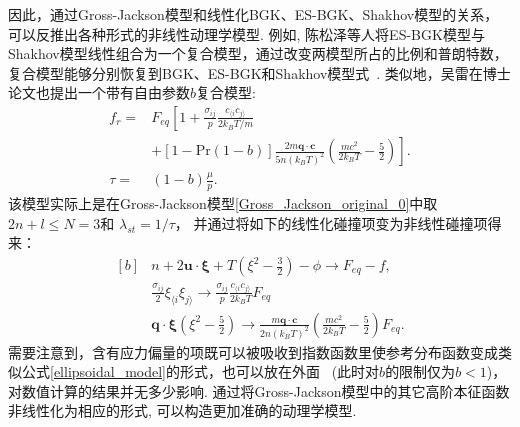 因此，通过Gross-Jackson模型和线性化BGK、ES-BGK、Shakhov模型的关系，可以反推出各种形式的非线性动理学模型. 例如, 陈松泽等人将ES-BGK模型与Shakhov模型线性组合为一个复合模型，通过改变两模型所占的比例和普朗特数，复合模型能够分别恢复到BGK、ES-BGK和Shakhov模型式~\cite{Chen2015ACA}. 类似地，吴雷在博士论文也提出一个带有自由参数$b$复合模型\cite{Wu2013PhDthesis}:
\begin{equation}\label{fnew}
\begin{aligned}
f_r=&F_{eq}
\left[1+
\frac{\sigma_{ij}}{p}
\frac{c_{\langle i}c_{j\rangle}}{2k_BT/m}\right.\\
&\left.+[1-\text{Pr}(1-b)]\frac{2m\bm{q}\cdot
	\bm{c}}{5n(k_BT)^2}\left(\frac{mc^2}{2k_BT}-\frac{5}{2}\right) \right].\\
\tau=&(1-b)\frac{\mu}{p}.
\end{aligned}
\end{equation}
该模型实际上是在Gross-Jackson模型\eqref{Gross_Jackson_original_0}中取$2n+l\leq{N}=3$和  $\lambda_{st}=1/\tau$， 并通过将如下的线性化碰撞项变为非线性碰撞项得来：
\begin{equation}\label{nonlinearization}
\begin{aligned}[b]
&{n}+2\bm{u}\cdot\bm{\xi}+T\left(\xi^2-\frac{3}{2}\right)-\phi
\rightarrow {F_{eq}}-f,\\
&\frac{\sigma_{ij}}{2}\xi_{\langle i}\xi_{j\rangle}
\rightarrow
\frac{\sigma_{ij}}{p}\frac{c_{\langle i}c_{j\rangle}}{2k_BT} F_{eq} \\
& \bm{q}\cdot\bm{\xi}\left(\xi^2-\frac{5}{2}\right) 
\rightarrow \frac{m\bm{q}\cdot
	\bm{c}}{2n(k_BT)^2}\left(\frac{mc^2}{2k_BT}-\frac{5}{2}\right)F_{eq}.
\end{aligned}
\end{equation}
需要注意到，含有应力偏量的项既可以被吸收到指数函数里使参考分布函数变成类似公式\eqref{ellipsoidal_model}的形式，也可以放在外面~ (此时对$b$的限制仅为$b<1$)，对数值计算的结果并无多少影响\cite{Wu2013PhDthesis}.   通过将Gross-Jackson模型中的其它高阶本征函数非线性化为相应的形式, 可以构造更加准确的动理学模型. 



